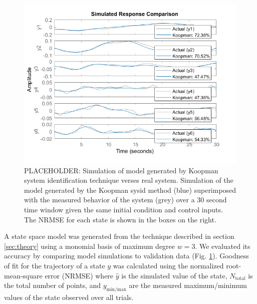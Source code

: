 \begin{figure}
    \centering
    \includegraphics[width=\linewidth]{figures/koopPlot_ph1.png}
    \caption{PLACEHOLDER: Simulation of model generated by Koopman system identification technique verses real system.
    Simulation of the model generated by the Koopman sysid method (blue) superimposed with the measured behavior of the system (grey) over a 30 second time window given the same initial condition and control inputs. The NRMSE for each state is shown in the boxes on the right. }
    \label{fig:koopmanSim}
\end{figure}


A state space model was generated from the technique described in section \ref{sec:theory} using a monomial basis of maximum degree $w=3$.
We evaluated its accuracy by comparing model simulations to validation data (Fig. \ref{fig:koopmanSim}).
Goodness of fit for the trajectory of a state $y$ was calculated using the normalized root-mean-square error (NRMSE)
where $\hat{y}$ is the simulated value of the state, $N_\text{total}$ is the total number of points, and $y_{\text{min/max}}$ are the measured maximum/minimum values of the state observed over all trials.

